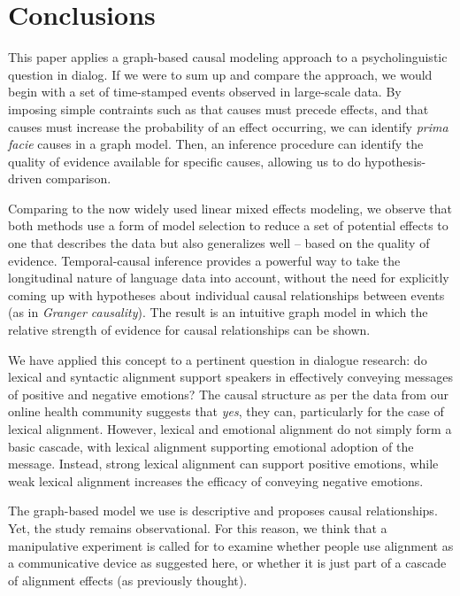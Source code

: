 \documentclass[man,biblatex,floatsintext]{apa6}
\begin{document}
\section{Conclusions}

This paper applies a graph-based causal modeling approach to a psycholinguistic question in dialog.  If we were to sum up and compare the approach, we would begin with a set of time-stamped events observed in large-scale data.  By imposing simple contraints such as that causes must precede effects, and that causes must increase the probability of an effect occurring, we can identify \emph{prima facie} causes in a graph model.  Then, an inference procedure can identify the quality of evidence available for specific causes, allowing us to do hypothesis-driven comparison.

Comparing to the now widely used linear mixed effects modeling, we observe that both methods use a form of model selection to reduce a set of potential effects to one that describes the data but also generalizes well -- based on the quality of evidence.  Temporal-causal inference provides a powerful way to take the longitudinal nature of language data into account, without the need for explicitly coming up with hypotheses about individual causal relationships between events (as in \emph{Granger causality}).  The result is an intuitive graph model in which the relative strength of evidence for causal relationships can be shown.

We have applied this concept to a pertinent question in dialogue research: do lexical and syntactic alignment support speakers in effectively conveying messages of positive and negative emotions?  The causal structure as per the data from our online health community suggests that \emph{yes}, they can, particularly for the case of lexical alignment.  However, lexical and emotional alignment do not simply form a basic cascade, with lexical alignment supporting emotional adoption of the message.  Instead, strong lexical alignment can support positive emotions, while weak lexical alignment increases the efficacy of conveying negative emotions.

The graph-based model we use is descriptive and proposes causal relationships.  Yet, the study remains observational.  For this reason, we think that a manipulative experiment is called for to examine whether people use alignment as a communicative device as suggested here, or whether it is just part of a cascade of alignment effects (as previously thought).
\end{document}
